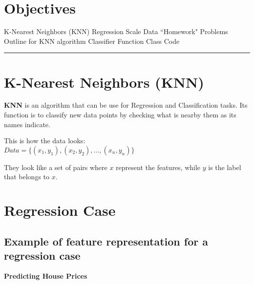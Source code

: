 \section*{Objectives}
\begin{outline}
    \1 K-Nearest Neighbors (KNN)
    \1 Regression
    \1 Scale Data
    \1 ``Homework" Problems
    \1 Outline for KNN algorithm
    \1 Classifier Function
    \1 Class Code
\end{outline}

\rule[0.0051in]{\textwidth}{0.00025in}

\section{K-Nearest Neighbors (KNN)}

\textbf{KNN} is an algorithm that can be use for Regression and Classification tasks. Its function is to classify new data points
by checking what is nearby them as its names indicate.

This is how the data looks:\\
$Data = \{(x_1, y_1), (x_2, y_2), \dots, (x_n, y_n)\}$

They look like a set of pairs where $x$ represent the features, while $y$ is the label that belongs to $x$.


\section{Regression Case}

\subsection{Example of feature representation for a regression case}

\begin{center}
    \textbf{Predicting House Prices}
\end{center}

\vspace{-0.5cm}

